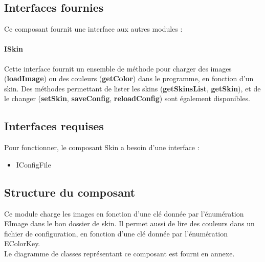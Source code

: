 \subsection{Interfaces fournies}

Ce composant fournit une interface aux autres modules :

\paragraph{ISkin}

Cette interface fournit un ensemble de méthode pour charger des images (\textbf{loadImage}) ou des couleurs (\textbf{getColor}) dans le programme, en fonction d'un skin. Des méthodes permettant de lister les skins (\textbf{getSkinsList}, \textbf{getSkin}), et de le changer (\textbf{setSkin}, \textbf{saveConfig}, \textbf{reloadConfig}) sont également disponibles.

\subsection{Interfaces requises}

Pour fonctionner, le composant Skin a besoin d'une interface :
\begin{itemize}
    \item IConfigFile
\end{itemize}

\subsection{Structure du composant}

Ce module charge les images en fonction d'une clé donnée par l'énumération EImage dans le bon dossier de skin. Il permet aussi de lire des couleurs  dans un fichier de configuration, en fonction d'une clé donnée par l'énumération EColorKey.\\

Le diagramme de classes représentant ce composant est fourni en annexe.